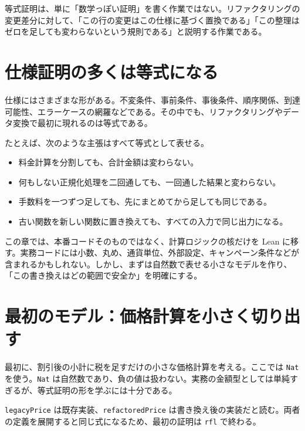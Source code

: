 \begin{intuitionbox}
等式証明は、単に「数学っぽい証明」を書く作業ではない。リファクタリングの変更差分に対して、「この行の変更はこの仕様に基づく置換である」「この整理はゼロを足しても変わらないという規則である」と説明する作業である。
\end{intuitionbox}


\section{仕様証明の多くは等式になる}

仕様にはさまざまな形がある。不変条件、事前条件、事後条件、順序関係、到達可能性、エラーケースの網羅などである。その中でも、リファクタリングやデータ変換で最初に現れるのは等式である。

たとえば、次のような主張はすべて等式として表せる。

\begin{itemize}
\item 料金計算を分割しても、合計金額は変わらない。
\item 何もしない正規化処理を二回通しても、一回通した結果と変わらない。
\item 手数料を一つずつ足しても、先にまとめてから足しても同じである。
\item 古い関数を新しい関数に置き換えても、すべての入力で同じ出力になる。
\end{itemize}

\begin{softwarebox}
この章では、本番コードそのものではなく、計算ロジックの核だけを Lean に移す。実務コードには小数、丸め、通貨単位、外部設定、キャンペーン条件などが含まれるかもしれない。しかし、まずは自然数で表せる小さなモデルを作り、「この書き換えはどの範囲で安全か」を明確にする。
\end{softwarebox}

\section{最初のモデル：価格計算を小さく切り出す}

最初に、割引後の小計に税を足すだけの小さな価格計算を考える。ここでは \texttt{Nat} を使う。\texttt{Nat} は自然数であり、負の値は扱わない。実務の金額型としては単純すぎるが、等式証明の形を学ぶには十分である。

\begin{leanbox}
\texttt{legacyPrice} は既存実装、\texttt{refactoredPrice} は書き換え後の実装だと読む。両者の定義を展開すると同じ式になるため、最初の証明は \texttt{rfl} で終わる。
\end{leanbox}

